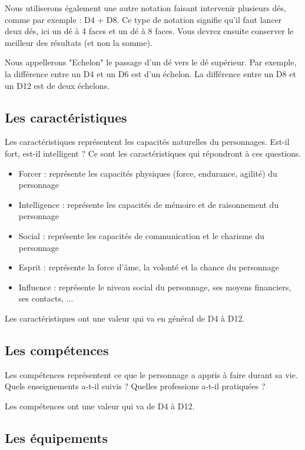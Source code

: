 Nous utiliserons également une autre notation faisant intervenir plusieurs dés, comme par exemple : D4 + D8. Ce type de notation signifie qu'il faut lancer deux dés, ici un dé à 4 faces et un dé à 8 faces. Vous devrez ensuite conserver le meilleur des résultats (et non la somme).

Nous appellerons "Echelon" le passage d'un dé vers le dé supérieur. Par exemple, la différence entre un D4 et un D6 est d'un échelon. La différence entre un D8 et un D12 est de deux échelons.

\subsection{Les caractéristiques}

Les caractéristiques représentent les capacités naturelles du personnages. Est-il fort, est-il intelligent ? Ce sont les caractéristiques qui répondront à ces questions.

\begin{itemize}
\item Forcer : représente les capacités physiques (force, endurance, agilité) du personnage
\item Intelligence : représente les capacités de mémoire et de raisonnement du personnage
\item Social : représente les capacités de communication et le charisme du personnage
\item Esprit : représente la force d'âme, la volonté et la chance du personnage
\item Influence : représente le niveau social du personnage, ses moyens financiers, ses contacts, ...
\end{itemize}

Les caractéristiques ont une valeur qui va en général de D4 à D12. 

\subsection{Les compétences}

Les compétences représentent ce que le personnage a appris à faire durant sa vie. Quels enseignements a-t-il suivis ? Quelles professions a-t-il pratiquées ?

Les compétences ont une valeur qui va de D4 à D12.

\subsection{Les équipements}

